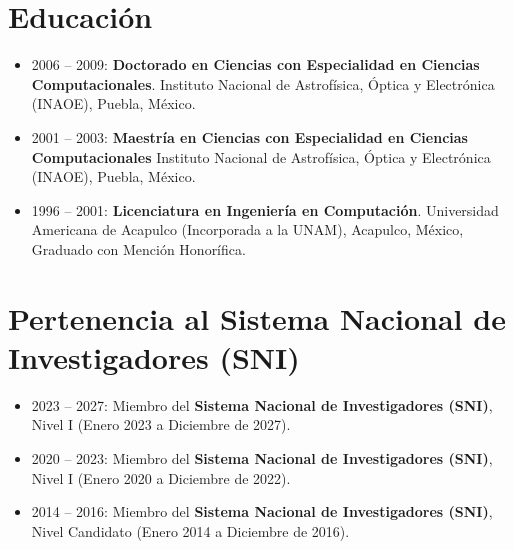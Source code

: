 \documentclass[letterpaper,10pt]{article}
\newcounter{num}
\begin{document}
\section{Educación}
 \begin{itemize}[leftmargin=0.15in, label={}]
\item 2006 -- 2009: \textbf{Doctorado en Ciencias con Especialidad en Ciencias Computacionales}. 
    Instituto Nacional de Astrofísica, Óptica y Electrónica (INAOE), Puebla, México.
%
\item 2001 -- 2003: \textbf{Maestría en Ciencias con Especialidad en Ciencias Computacionales}
    Instituto Nacional de Astrofísica, Óptica y Electrónica (INAOE), Puebla, México. 

\item 1996 -- 2001: \textbf{Licenciatura en Ingeniería en Computación}.
	Universidad Americana de Acapulco (Incorporada a la UNAM), Acapulco, México, Graduado con Mención Honorífica. 
 \end{itemize}


\section{Pertenencia al Sistema Nacional de Investigadores (SNI)}
 \begin{itemize}[leftmargin=0.15in, label={}]
\item 2023 -- 2027: Miembro del \textbf{Sistema Nacional de Investigadores (SNI)}, Nivel I (Enero 2023 a Diciembre de 2027). 
\item 2020 -- 2023: Miembro del \textbf{Sistema Nacional de Investigadores (SNI)}, Nivel I (Enero 2020 a Diciembre de 2022). 
\item 2014 -- 2016: Miembro del \textbf{Sistema Nacional de Investigadores (SNI)}, Nivel Candidato (Enero 2014 a Diciembre de 2016). 
 \end{itemize}
\end{document}
